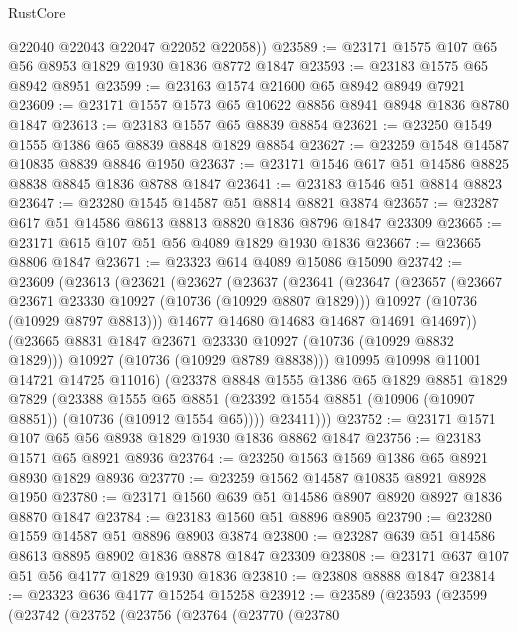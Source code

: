 \begin{lexlean}{RustCore}
\begin{coremodule}
        @22040
        @22043
        @22047
        @22052
        @22058))
@23589 := @23171 @1575 @107 @65 @56 @8953 @1829 @1930 @1836 @8772 @1847
@23593 := @23183 @1575 @65 @8942 @8951
@23599 := @23163 @1574 @21600 @65 @8942 @8949 @7921
@23609 := @23171 @1557 @1573 @65 @10622 @8856 @8941 @8948 @1836 @8780 @1847
@23613 := @23183 @1557 @65 @8839 @8854
@23621 := @23250 @1549 @1555 @1386 @65 @8839 @8848 @1829 @8854
@23627 := @23259 @1548 @14587 @10835 @8839 @8846 @1950
@23637 := @23171 @1546 @617 @51 @14586 @8825 @8838 @8845 @1836 @8788 @1847
@23641 := @23183 @1546 @51 @8814 @8823
@23647 := @23280 @1545 @14587 @51 @8814 @8821 @3874
@23657 := @23287 @617 @51 @14586 @8613 @8813 @8820 @1836 @8796 @1847 @23309
@23665 := @23171 @615 @107 @51 @56 @4089 @1829 @1930 @1836
@23667 := @23665 @8806 @1847
@23671 := @23323 @614 @4089 @15086 @15090
@23742 := @23609
    (@23613
      (@23621
        (@23627
          (@23637
            (@23641
              (@23647
                (@23657
                  (@23667 @23671 @23330 @10927 (@10736 (@10929 @8807 @1829)))
                  @10927
                  (@10736 (@10929 @8797 @8813)))
                @14677
                @14680
                @14683
                @14687
                @14691
                @14697))
            (@23665 @8831 @1847 @23671 @23330 @10927 (@10736 (@10929 @8832 @1829)))
            @10927
            (@10736 (@10929 @8789 @8838)))
          @10995
          @10998
          @11001
          @14721
          @14725
          @11016)
        (@23378
          @8848
          @1555
          @1386
          @65
          @1829
          @8851
          @1829
          @7829
          (@23388
            @1555
            @65
            @8851
            (@23392 @1554 @8851 (@10906 (@10907 @8851)) (@10736 (@10912 @1554 @65))))
          @23411)))
@23752 := @23171 @1571 @107 @65 @56 @8938 @1829 @1930 @1836 @8862 @1847
@23756 := @23183 @1571 @65 @8921 @8936
@23764 := @23250 @1563 @1569 @1386 @65 @8921 @8930 @1829 @8936
@23770 := @23259 @1562 @14587 @10835 @8921 @8928 @1950
@23780 := @23171 @1560 @639 @51 @14586 @8907 @8920 @8927 @1836 @8870 @1847
@23784 := @23183 @1560 @51 @8896 @8905
@23790 := @23280 @1559 @14587 @51 @8896 @8903 @3874
@23800 := @23287 @639 @51 @14586 @8613 @8895 @8902 @1836 @8878 @1847 @23309
@23808 := @23171 @637 @107 @51 @56 @4177 @1829 @1930 @1836
@23810 := @23808 @8888 @1847
@23814 := @23323 @636 @4177 @15254 @15258
@23912 := @23589
    (@23593
      (@23599
        (@23742
          (@23752
            (@23756
              (@23764
                (@23770
                  (@23780

\end{coremodule}
\end{lexlean}
